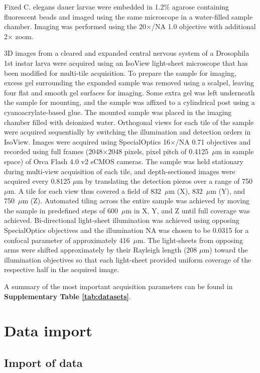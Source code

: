Fixed C. elegans dauer larvae were embedded in 1.2$\%$ agarose containing fluorescent beads and imaged using the same microscope in a water-filled sample chamber. Imaging was performed using the 20$\times$/NA 1.0 objective with additional 2$\times$ zoom. 

3D images from a cleared and expanded central nervous system of a Drosophila 1st instar larva were acquired using an IsoView light-sheet microscope\cite{isoview} that has been modified for multi-tile acquisition. To prepare the sample for imaging, excess gel surrounding the expanded sample was removed using a scalpel, leaving four flat and smooth gel surfaces for imaging. Some extra gel was left underneath the sample for mounting, and the sample was affixed to a cylindrical post using a cyanoacrylate-based glue. The mounted sample was placed in the imaging chamber filled with deionized water. Orthogonal views for each tile of the sample were acquired sequentially by switching the illumination and detection orders in IsoView. Images were acquired using SpecialOptics 16$\times$/NA 0.71 objectives and recorded using full frames (2048$\times$2048 pixels, pixel pitch of 0.4125~$\mu$m in sample space) of Orca Flash 4.0 v2 sCMOS cameras. The sample was held stationary during multi-view acquisition of each tile, and depth-sectioned images were acquired every 0.8125 $\mu$m by translating the detection piezos over a range of 750~$\mu$m. A tile for each view thus covered a field of 832~$\mu$m (X), 832~$\mu$m (Y), and 750~$\mu$m (Z). Automated tiling across the entire sample was achieved by moving the sample in predefined steps of 600~$\mu$m in X, Y, and Z until full coverage was achieved. Bi-directional light-sheet illumination was achieved using opposing SpecialOptics objectives and the illumination NA was chosen to be 0.0315 for a confocal parameter of approximately 416~$\mu$m. The light-sheets from opposing arms were shifted approximately by their Rayleigh length (208 $\mu$m) toward the illumination objectives so that each light-sheet provided uniform coverage of the respective half in the acquired image. 

A summary of the most important acquisition parameters can be found in \textbf{Supplementary Table \ref{tab:datasets}}.


\section{Data import}
\label{sec:sup-note1}

\subsection*{Import of data}

